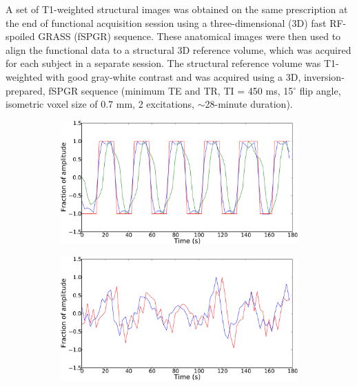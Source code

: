 \documentclass[review,1p,authoryear]{elsarticle}
\begin{document}
A set of T1-weighted structural images was obtained on the same prescription at the end of functional acquisition session using a three-dimensional (3D) fast RF-spoiled GRASS (fSPGR) sequence. 
These anatomical images were then used to align the functional data to a structural 3D reference volume, which was acquired for each subject in a separate session. 
The structural reference volume was T1-weighted with good gray-white contrast and was acquired using a 3D, inversion-prepared, fSPGR sequence (minimum TE and TR, TI = 450 ms, 15$^\circ$ flip angle, isometric voxel size of 0.7 mm, 2 excitations, $\sim$28-minute duration).

\begin{figure}
\centering
\begin{subfigure}{0.4\textwidth}
\centering
\includegraphics[width=\textwidth]{figures/square-wiener-deconvolution}
\caption{}
\label{fig:wiener-square}
\end{subfigure}
\begin{subfigure}{0.4\textwidth}
\centering
\includegraphics[width=\textwidth]{figures/voxel-wiener-deconvolution}

\end{subfigure}
\end{figure}
\end{document}
